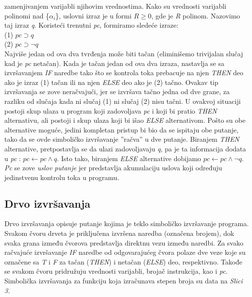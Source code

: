 \documentclass[a4paper]{article}
\begin{document}
zamenjivanjem varijabli njihovim vrednostima. Kako su vrednosti varijabli polinomi nad \{$\alpha_i$\}, uslovni izraz je u formi $R \ge 0$, gde je \textit{R} polinom. Nazovimo taj izraz \textit{q}. Koristeći trenutni \textit{pc}, formiramo sledeće izraze: \\
(1) $pc \supset q$ \\  
(2) $pc \supset \neg q $ \\
Najviše jedan od ova dva tvrđenja može biti tačan (eliminišemo trivijalan slučaj kad je \textit{pc} netačan). Kada je tačan jedan od ova dva izraza, nastavlja se sa izvršavanjem \textit{IF} naredbe tako što se kontrola toka prebacuje na njen \textit{THEN} deo ako je izraz (1) tačan ili na njen \textit{ELSE} deo ako je (2) tačno. Ovakav tip izvršavanja se zove neračvajući, jer se izvršava tačno jedna od dve grane, za razliku od slučaja kada ni slučaj (1) ni slučaj (2) nisu tačni. U ovakvoj situaciji postoji skup ulaza u program koji zadovoljava \textit{pc} i koji bi pratio \textit{THEN} alternativu, ali postoji i skup ulaza koji bi išao \textit{ELSE} alternativom. Pošto su obe alternative moguće, jedini kompletan pristup bi bio da se ispitaju obe putanje, tako da se ovde simboličko izvršavanje ''račva'' u dve putanje. Biranjem \textit{THEN} alternative, pretpostavlja se da ulazi zadovoljavaju \textit{q}, pa je ta informacija dodata u \textit{pc} : $ pc \gets pc \wedge q $. Isto tako, biranjem \textit{ELSE} alternative dobijamo 
$ pc \gets pc \wedge \neg q $. \textit{Pc} se zove \textit{uslov putanje} jer predstavlja akumulaciju uslova koji određuju jedinstvenu kontrolu toka u programu.

\subsection{Drvo izvršavanja}
\label{subsec:podnaslov1}
Drvo izvršavanja opisuje putanje kojima je teklo simboličko izvršavanje programa. Svakom čvoru drveta je priključena izvršena naredba (označena brojem), dok svaka grana između čvorova predstavlja direktnu vezu između naredbi. Za svako račvajuće izvršavanje \textit{IF} naredbe od odgovarajućeg čvora polaze dve veze koje su označene sa \textit{T} i \textit{F} za tačan (\textit{THEN}) i netačan (\textit{ELSE}) deo, respektivno. Takođe se svakom čvoru pridružuju vrednosti varijabli, brojač instrukcija, kao i \textit {pc}. Simbolička izvršavanja za funkciju koja izračunava stepen broja su data na \textit {Slici 3.} \cite{simbExec}
\end{document}
